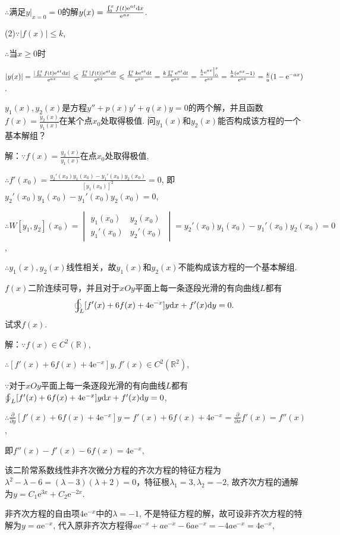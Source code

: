 \documentclass[12pt,UTF8]{ctexart}
\newcommand{\BLOInt}[2]{\varoint\nolimits_{#1}#2}
\newcommand{\md}[1]{\mathrm d#1}
\newcommand{\varppx}[1]{\frac{\partial}{\partial x} #1}
\newcommand{\varppy}[1]{\frac{\partial}{\partial y} #1}
\newcommand{\me}[0]{\mathrm e}
\begin{document}
\begin{enumerate}
$\therefore$满足$y\big|_{x=0}=0$的解$y(x)=\frac{\varint\nolimits_0^xf(t)\me^{at}\md x}{\me^{ax}}$.

(2)$\because|f(x)|\leqslant k$,

$\therefore$当$x\geqslant0$时

$|y(x)|=\frac{|\varint\nolimits_0^xf(t)\me^{at}\md x|}{\me^{ax}}\leqslant\frac{\varint\nolimits_0^x|f(t)|\me^{at}\md t}{\me^{ax}}\leqslant\frac{\varint\nolimits_0^xk\me^{at}\md t}{\me^{ax}}=\frac{k\varint\nolimits_0^x\me^{at}\md t}{\me^{ax}}=\frac{\frac ka\me^{ax}\big|_0^x}{\me^{ax}}=\frac{\frac ka(\me^{ax}-1)}{\me^{ax}}=\frac ka(1-\me^{-ax})$.

$y_1(x),y_2(x)$是方程$y''+p(x)y'+q(x)y=0$的两个解，并且函数$f(x)=\frac{y_2(x)}{y_1(x)}$在某个点$x_0$处取得极值. 问$y_1(x)$和$y_2(x)$能否构成该方程的一个基本解组？

解：$\because f(x)=\frac{y_2(x)}{y_1(x)}$在点$x_0$处取得极值,

$\therefore f'(x_0)=\frac{y_2'(x_0)y_1(x_0)-y_1'(x_0)y_2(x_0)}{[y_1(x_0)]^2}=0$, 即$y_2'(x_0)y_1(x_0)-y_1'(x_0)y_2(x_0)=0$,

$\therefore W[y_1,y_2](x_0)=\begin{vmatrix}y_1(x_0)&y_2(x_0)\\y_1'(x_0)&y_2'(x_0)\end{vmatrix}=y_2'(x_0)y_1(x_0)-y_1'(x_0)y_2(x_0)=0$,

$\therefore y_1(x),y_2(x)$线性相关，故$y_1(x)$和$y_2(x)$不能构成该方程的一个基本解组.

$f(x)$二阶连续可导，并且对于$xOy$平面上每一条逐段光滑的有向曲线$L$都有\[\BLOInt L{[f'(x)+6f(x)+4\me^{-x}]y\md x+f'(x)\md y}=0.\]
试求$f(x)$.

解：$\because f(x)\in C^2(\mathbb R)$,

$\therefore[f'(x)+6f(x)+4\me^{-x}]y,f'(x)\in C^2(\mathbb R^2)$,

$\because$对于$xOy$平面上每一条逐段光滑的有向曲线$L$都有\\
$\BLOInt L{[f'(x)+6f(x)+4\me^{-x}]y\md x+f'(x)\md y}=0$,

$\therefore\varppy{[f'(x)+6f(x)+4\me^{-x}]y}=f'(x)+6f(x)+4\me^{-x}=\varppx{f'(x)}=f''(x)$,

即$f''(x)-f'(x)-6f(x)=4\me^{-x}$,

该二阶常系数线性非齐次微分方程的齐次方程的特征方程为$\lambda^2-\lambda-6=(\lambda-3)(\lambda+2)=0$，特征根$\lambda_1=3,\lambda_2=-2$, 故齐次方程的通解为$y=C_1\me^{3x}+C_2\me^{-2x}$.

非齐次方程的自由项$4\me^{-x}$中的$\lambda=-1$, 不是特征方程的解，故可设非齐次方程的特解为$y=a\me^{-x}$, 代入原非齐次方程得$a\me^{-x}+a\me^{-x}-6a\me^{-x}=-4a\me^{-x}=4\me^{-x}$,


\end{enumerate}
\end{document}

